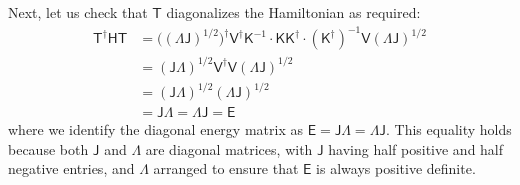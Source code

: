 Next, let us check that $\mathsf{T}$ diagonalizes the Hamiltonian as required:
\begin{align*}
    \mathsf{T}^{\dagger} \mathsf{HT}
    &= \big( \mathsf{(\Lambda J)}^{1/2} \big)^{\dagger} \mathsf{V}^{\dagger} \mathsf{K}^{-1} \cdot \mathsf{KK}^{\dagger} \cdot (\mathsf{K}^{\dagger})^{-1} \mathsf{V} \mathsf{(\Lambda J)}^{1/2} \\
    &= \mathsf{(J\Lambda)}^{1/2} \mathsf{V}^{\dagger} \mathsf{V} \mathsf{(\Lambda J)}^{1/2} \\
    &= \mathsf{(J\Lambda)}^{1/2} \mathsf{(\Lambda J)}^{1/2} \\
    &= \mathsf{J\Lambda} = \mathsf{\Lambda J} = \mathsf{E}
\end{align*}
where we identify the diagonal energy matrix as $\mathsf{E} = \mathsf{J\Lambda} = \mathsf{\Lambda J}$. This equality holds because both $\mathsf{J}$ and $\mathsf{\Lambda}$ are diagonal matrices, with $\mathsf{J}$ having half positive and half negative entries, and $\mathsf{\Lambda}$ arranged to ensure that $\mathsf{E}$ is always positive definite.



\newpage



